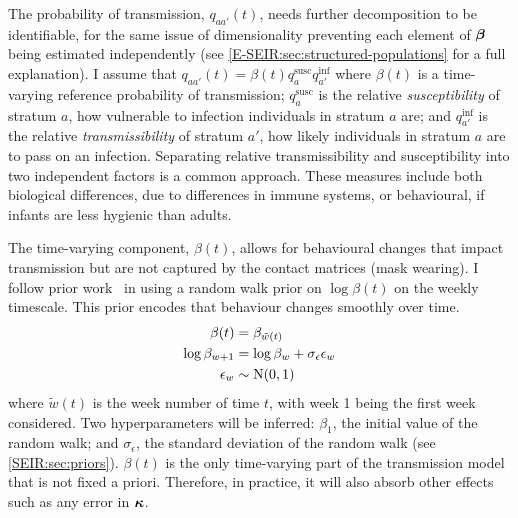 \documentclass[thesis.tex]{subfiles}
\begin{document}
The probability of transmission, $q_{aa'}(t)$, needs further decomposition to be identifiable, for the same issue of dimensionality preventing each element of $\bm{\beta}$ being estimated independently (see \cref{E-SEIR:sec:structured-populations} for a full explanation).
I assume that $q_{aa'}(t) = \beta(t) q^\text{susc}_{a} q^\text{inf}_{a'}$ where $\beta(t)$ is a time-varying reference probability of transmission; $q^\text{susc}_a$ is the relative \emph{susceptibility} of stratum $a$, \ie how vulnerable to infection individuals in stratum $a$ are; and $q^\text{inf}_{a'}$ is the relative \emph{transmissibility} of stratum $a'$, \ie how likely individuals in stratum $a$ are to pass on an infection.
Separating relative transmissibility and susceptibility into two independent factors is a common approach.
These measures include both biological differences, \eg due to differences in immune systems, or behavioural, \eg if infants are less hygienic than adults.

The time-varying component, $\beta(t)$, allows for behavioural changes that impact transmission but are not captured by the contact matrices (\eg mask wearing).
I follow prior work~\autocite[e.g.][]{birrellRealtime} in using a random walk prior on $\log\beta(t)$  on the weekly timescale.
This prior encodes that behaviour changes smoothly over time.
\begin{align}
    \beta(t) &= \beta_{\tilde{w}(t)} \\
    \log\beta_{w+1} &= \log\beta_w + \sigma_\epsilon \epsilon_w \\
    \epsilon_w &\sim \operatorname{N}(0, 1)
\end{align}
where $\tilde{w}(t)$ is the week number of time $t$, with week 1 being the first week considered.
Two hyperparameters will be inferred: $\beta_1$, the initial value of the random walk; and $\sigma_\epsilon$, the standard deviation of the random walk (see \cref{SEIR:sec:priors}).
$\beta(t)$ is the only time-varying part of the transmission model that is not fixed a priori.
Therefore, in practice, it will also absorb other effects such as any error in $\bm{\kappa}$.

\end{document}
